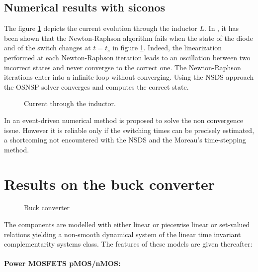 \subsection{Numerical results with {\sc siconos}}
\label{section32}

The figure \ref{fig:SIMU_CS} depicts the current evolution through the inductor $L$. In \cite{maffezzoni2006}, it has been shown that the Newton-Raphson algorithm fails when the state of the diode and of the switch changes at $t=t_s$ in figure \ref{fig:SIMU_CS}. Indeed, the linearization performed at each Newton-Raphson iteration leads to an oscillation between two incorrect states and never convergse to the correct one. The Newton-Raphson iterations enter into a infinite loop without converging.  Using the NSDS approach the OSNSP solver converges and computes the correct state. 


 \begin{figure}[h]
 \resizebox{\linewidth}{!}{ }
  \label{fig:SIMU_CS}
\caption{Current through the inductor.}
 \end{figure}


\begin{remark}
In \cite{maffezzoni2006} an event-driven numerical method is proposed to solve the non convergence issue. However it is reliable only if the switching times can be precisely estimated, a shortcoming not encountered  with the NSDS and the  Moreau's time-stepping method. 
\end{remark}

\section{Results on the buck converter}
\label{section4}


\begin{figure}[!ht]
\centerline{
 \scalebox{1.0}{
    
 }
}
\caption{Buck converter}
\label{fig-Buck-converter}
\end{figure}
The components are modelled with either linear or piecewise linear or set-valued relations yielding a non-smooth dynamical system of the linear time invariant complementarity systems class. The features of these models are given thereafter:

\paragraph{Power MOSFETS pMOS/nMOS:} 





